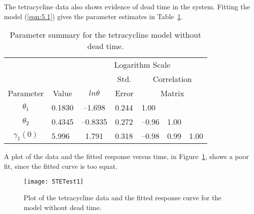 \begin{example}\label{tet:deadtime}

The tetracycline data also shows evidence of dead time in the
system.
Fitting the model (\ref{eqn:5.1}) gives the parameter estimates in
Table~\ref{tbl:tetest1}.
\begin{table}
  \begin{center}
    \caption{\label{tbl:tetest1}
      Parameter summary for the tetracycline model without dead time.
      }
    \begin{tabular}{clcllll} \hline
      &&\multicolumn{5}{c}{Logarithm Scale}\\ 
      &&& \multicolumn{1}{c}{Std.} & \multicolumn{3}{c}{Correlation}\\
      \multicolumn{1}{c}{Parameter} &\multicolumn{1}{c}{Value} &
      \multicolumn{1}{c}{$ln\theta $} & \multicolumn{1}{c}{Error} &
      \multicolumn{3}{c}{Matrix}\\ \hline
      $\theta_{1}$&0.1830&--1.698&0.244&1.00\\
      $\theta_{2}$&0.4345&--\/0.8335&0.272&--\/0.96&1.00\\
      $\gamma_1 ( 0 )$&5.996&1.791&0.318&--\/0.98&0.99&1.00\\ \hline
    \end{tabular}
  \end{center}
\end{table}
A plot of the data and the fitted response versus time, in
Figure~\ref{fig:TETest1}, shows a poor fit, since the fitted curve is too
squat.
\begin{figure}
  \centerline{\texttt{[image: 5TETest1]}}%
  \caption{\label{fig:TETest1}
  Plot of the tetracycline data and the fitted response curve for the model
  without dead time.
  }
\end{figure}


\end{example}
